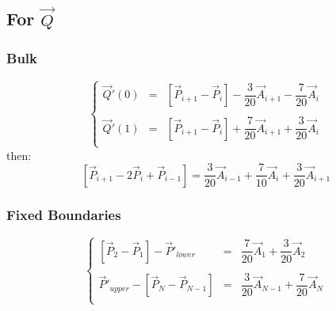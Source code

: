 \documentclass[aps,12pt]{revtex4}
\begin{document}
 
\subsection{For $\vec{Q}$}
\subsubsection{Bulk}

\begin{equation}
\left\lbrace
\begin{array}{rcl}
	\vec{Q}'(0) & = & \left[\vec{P}_{i+1}-\vec{P}_i\right] - \dfrac{3}{20} \vec{A}_{i+1} - \dfrac{7}{20}\vec{A}_{i} \\
	\\
	\vec{Q}'(1) & = & \left[\vec{P}_{i+1}-\vec{P}_i\right] + \dfrac{7}{20} \vec{A}_{i+1} + \dfrac{3}{20}\vec{A}_{i}\\
\end{array}
\right.
\end{equation}
then:
\begin{equation}
	 \left[\vec{P}_{i+1}-2\vec{P}_i+\vec{P}_{i-1}\right] = \dfrac{3}{20} \vec{A}_{i-1} + \dfrac{7}{10}\vec{A}_{i} + \dfrac{3}{20} \vec{A}_{i+1}
\end{equation}

\subsubsection{Fixed Boundaries}
 
\begin{equation}
\left\lbrace
\begin{array}{rcl}
 	 \left[\vec{P}_{2}-\vec{P}_1\right] - \vec{P}'_{lower}& = &\dfrac{7}{20} \vec{A}_1 + \dfrac{3}{20} \vec{A}_{2}\\
	 \\
	\vec{P}'_{upper} - \left[\vec{P}_N - \vec{P}_{N-1}\right] & = & \dfrac{3}{20} \vec{A}_{N-1} + \dfrac{7}{20} \vec{A}_{N}\\
\end{array}
\right.
\end{equation}
\end{document}

